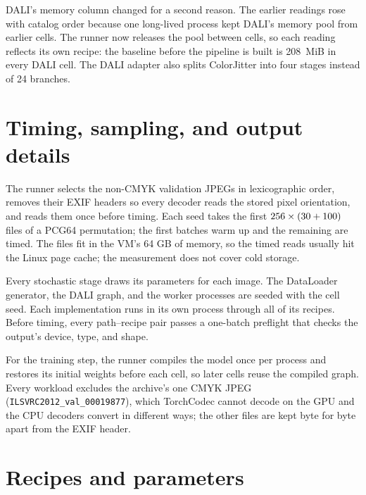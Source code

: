 \documentclass[11pt]{article}
\begin{document}
DALI's memory column changed for a second reason. The earlier readings rose with catalog order
because one long-lived process kept DALI's memory pool from earlier cells. The runner now releases
the pool between cells, so each reading reflects its own recipe: the baseline before the pipeline
is built is 208~MiB in every DALI cell. The DALI adapter also splits ColorJitter into four stages
instead of 24 branches.

\begingroup\footnotesize


\endgroup

\clearpage
\appendix

\section{Timing, sampling, and output details}
\label{app:setup}

The runner selects the \DatasetFiles{} non-CMYK validation JPEGs in lexicographic order, removes their EXIF
headers so every decoder reads the stored pixel orientation, and reads them once before timing.
Each seed takes the first \(256\times(30+100)\) files of a PCG64 permutation; the first \WarmupBatches{} batches
warm up and the remaining \MeasuredBatches{} are timed. The files fit in the VM's 64 GB of memory, so the timed
reads usually hit the Linux page cache; the measurement does not cover cold storage.

Every stochastic stage draws its parameters for each image. The DataLoader generator, the DALI
graph, and the worker processes are seeded with the cell seed. Each implementation runs in its
own process through all of its recipes. Before timing, every path--recipe pair passes a
one-batch preflight that checks the output's device, type, and shape.

For the training step, the runner compiles the model once per process and restores its initial
weights before each cell, so later cells reuse the compiled graph. Every workload excludes
the archive's one CMYK JPEG (\texttt{ILSVRC2012\_val\_00019877}), which TorchCodec cannot decode on the GPU
and the CPU decoders convert in different ways; the other \DatasetFiles{} files are kept byte for byte
apart from the EXIF header.

\clearpage
\section{Recipes and parameters}
\label{app:recipes}
\end{document}
